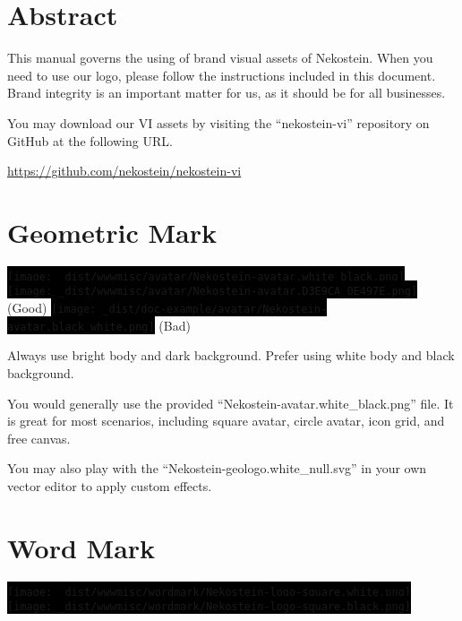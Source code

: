 \documentclass[a4paper,11pt]{article}
\begin{document}
\sffamily


\newcommand{\altfbox}[1]{%
    \colorbox{black}{#1}%
}







\section{Abstract}
This manual governs the using of brand visual assets of Nekostein.
When you need to use our logo, please follow the instructions included in this document.
Brand integrity is an important matter for us, as it should be for all businesses.

You may download our VI assets by visiting the ``nekostein-vi'' repository on GitHub at the following URL.

\begin{center}
    \href{https://github.com/nekostein/nekostein-vi}{https://github.com/nekostein/nekostein-vi}
\end{center}






\section{Geometric Mark}
\altfbox{\texttt{[image: \_dist/wwwmisc/avatar/Nekostein-avatar.white\_black.png]}}~~%
\altfbox{\texttt{[image: \_dist/wwwmisc/avatar/Nekostein-avatar.D3E9CA\_0E497E.png]}} (Good)
\hfill
\altfbox{\texttt{[image: \_dist/doc-example/avatar/Nekostein-avatar.black\_white.png]}} (Bad)

Always use bright body and dark background. Prefer using white body and black background.

You would generally use the provided ``Nekostein-avatar.white\_black.png'' file.
It is great for most scenarios, including square avatar, circle avatar, icon grid, and free canvas.

You may also play with the ``Nekostein-geologo.white\_null.svg'' in your own vector editor to apply custom effects.


\section{Word Mark}
\altfbox{\texttt{[image: \_dist/wwwmisc/wordmark/Nekostein-logo-square.white.png]}}~~%
\altfbox{\texttt{[image: \_dist/wwwmisc/wordmark/Nekostein-logo-square.black.png]}}
\end{document}
